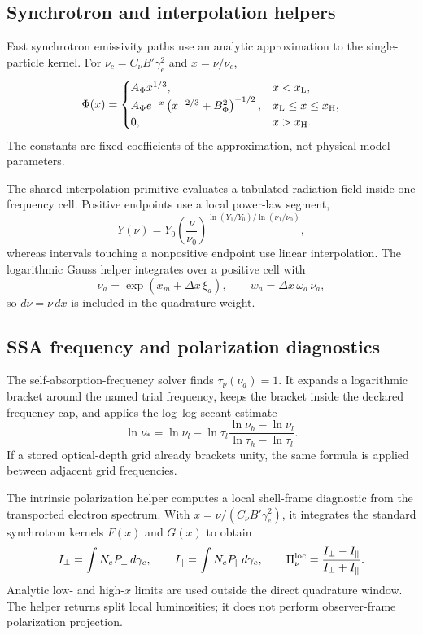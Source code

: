 \documentclass[twocolumn]{aastex702}
\begin{document}
\subsection{Synchrotron and interpolation helpers}

Fast synchrotron emissivity paths use an analytic approximation to the
single-particle kernel.  For \(\nu_c=C_\nu B'\gamma_e^2\) and \(x=\nu/\nu_c\),
\begin{equation}
\Phi(x)=
\begin{cases}
A_\Phi x^{1/3}, & x<x_{\rm L},\\
A_\Phi e^{-x}\left(x^{-2/3}+B_\Phi^2\right)^{-1/2},
& x_{\rm L}\le x\le x_{\rm H},\\
0, & x>x_{\rm H}.
\end{cases}
\end{equation}
The constants are fixed coefficients of the approximation, not physical model
parameters.

The shared interpolation primitive evaluates a tabulated radiation field inside
one frequency cell.  Positive endpoints use a local power-law segment,
\begin{equation}
Y(\nu)=Y_0\left(\frac{\nu}{\nu_0}\right)^{
\ln(Y_1/Y_0)/\ln(\nu_1/\nu_0)},
\end{equation}
whereas intervals touching a nonpositive endpoint use linear interpolation.  The
logarithmic Gauss helper integrates over a positive cell with
\begin{equation}
\nu_a=\exp(x_m+\Delta x\,\xi_a),\qquad
w_a=\Delta x\,\omega_a\,\nu_a,
\end{equation}
so \(d\nu=\nu\,dx\) is included in the quadrature weight.

\subsection{SSA frequency and polarization diagnostics}

The self-absorption-frequency solver finds \(\tau_\nu(\nu_a)=1\).  It expands a
logarithmic bracket around the named trial frequency, keeps the bracket inside
the declared frequency cap, and applies the log--log secant estimate
\begin{equation}
\ln\nu_\ast=
\ln\nu_l-\ln\tau_l
\frac{\ln\nu_h-\ln\nu_l}{\ln\tau_h-\ln\tau_l}.
\end{equation}
If a stored optical-depth grid already brackets unity, the same formula is
applied between adjacent grid frequencies.

The intrinsic polarization helper computes a local shell-frame diagnostic from
the transported electron spectrum.  With \(x=\nu/(C_\nu B'\gamma_e^2)\), it
integrates the standard synchrotron kernels \(F(x)\) and \(G(x)\) to obtain
\begin{equation}
I_\perp=\int N_eP_\perp\,d\gamma_e,\qquad
I_\parallel=\int N_eP_\parallel\,d\gamma_e,\qquad
\Pi_\nu^{\rm loc}=\frac{I_\perp-I_\parallel}{I_\perp+I_\parallel}.
\end{equation}
Analytic low- and high-\(x\) limits are used outside the direct quadrature
window.  The helper returns split local luminosities; it does not perform
observer-frame polarization projection.
\end{document}
